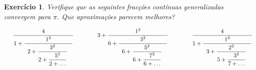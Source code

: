 \documentclass{article}
\newtheorem{ex}{Exercício}[section]
\begin{document}
\begin{ex}
Verifique que as seguintes fracções contínuas generalizadas convergem para $\pi$. Que aproximações parecem melhores?  

 \[
\hspace{0.5cm}
\displaystyle{ \frac{4 }
{ 1+\displaystyle{\frac{1^2}{ 
                           {\begin{array}{l}
                              2+\displaystyle{ \frac{3^2}{2+ \displaystyle \frac{5^5}{2+\ldots } }  }\,\, 
                           \end{array}
                           }
                           }}}} \qquad \qquad 
                              3+
\displaystyle{ \frac{1^2 }
{ 6+\displaystyle{\frac{3^2}{ 
                        {\begin{array}{l}
                              6+\displaystyle{ \frac{5^2}{6+ \displaystyle \frac{7^2}{6+\ldots } }  }\,\, 
                             \end{array}
                             }
                             }}}}      \qquad \qquad      
\displaystyle{ \frac{4 }
{ 1+\displaystyle{\frac{1^2}{ 
                          {\begin{array}{l}
                      3+\displaystyle{ \frac{2^2}{5+ \displaystyle \frac{3^2}{7+\ldots } }  }\,\, 
                        \end{array}
                         }
                          }}}}                                                   
\]
\end{ex}
\end{document}
